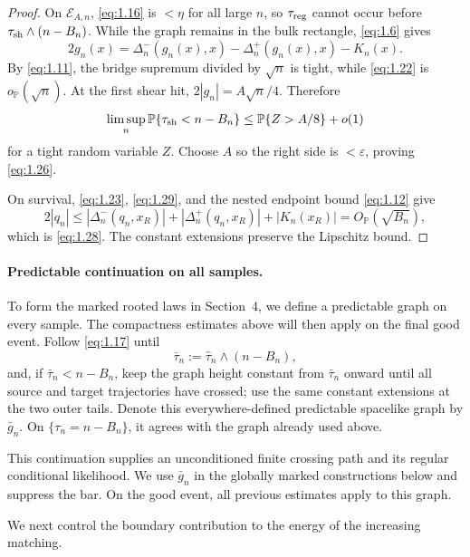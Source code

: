 \documentclass[11pt,reqno]{amsart}
\theoremstyle{definition}
\theoremstyle{remark}
\numberwithin{equation}{section}
\newcommand{\Pp}{\mathbb P}
\begin{document}
\begin{proof}
On \(\mathcal E_{A,n}\), \eqref{eq:1.16} is \(<\eta\) for all large \(n\), so
\(\tau_{\rm reg}\) cannot occur before
\(\tau_{\rm sh}\wedge(n-B_n)\).  While the graph remains in the bulk
rectangle, \eqref{eq:1.6} gives
\begin{equation}
2g_n(x)
=
\Delta_n^-(g_n(x),x)-\Delta_n^+(g_n(x),x)-K_n(x).
\label{eq:1.29}
\end{equation}
By \eqref{eq:1.11}, the bridge supremum divided by \(\sqrt n\) is tight, while
\eqref{eq:1.22} is \(o_{\Pp}(\sqrt n)\).  At the first shear hit,
\(2|g_n|=A\sqrt n/4\).  Therefore
\[
\limsup_n\Pp\{\tau_{\rm sh}<n-B_n\}
\le
\Pp\{Z>A/8\}+o(1)
\]
for a tight random variable \(Z\).  Choose \(A\) so the right side is
\(<\varepsilon\), proving \eqref{eq:1.26}.

On survival, \eqref{eq:1.23}, \eqref{eq:1.29}, and the nested endpoint bound \eqref{eq:1.12} give
\[
2|q_n|
\le
|\Delta_n^-(q_n,x_R)|
+
|\Delta_n^+(q_n,x_R)|
+
|K_n(x_R)|
=
O_{\Pp}(\sqrt{B_n}),
\]
which is \eqref{eq:1.28}.  The constant extensions preserve the Lipschitz bound.
\end{proof}

\paragraph{Predictable continuation on all samples.}
To form the marked rooted laws in Section~4, we define a predictable graph
on every sample.  The compactness estimates above will then apply on the
final good event.  Follow
\eqref{eq:1.17} until
\[
\bar\tau_n:=\widehat\tau_n\wedge(n-B_n),
\]
and, if \(\bar\tau_n<n-B_n\), keep the graph height constant from
\(\bar\tau_n\) onward until all source and target trajectories have crossed; use
the same constant extensions at the two outer tails.  Denote this everywhere-defined
predictable spacelike graph by \(\bar g_n\).  On
\(\{\tau_n=n-B_n\}\), it agrees with the graph already used above.

This continuation supplies an unconditioned finite crossing path and its
regular conditional likelihood.  We use \(\bar g_n\) in the globally marked
constructions below and suppress the bar.  On the good event, all previous
estimates apply to this graph.

We next control the boundary contribution to the energy of the increasing matching.
\end{document}
